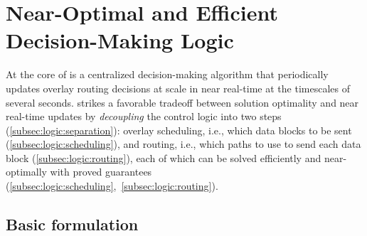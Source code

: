 \section{Near-Optimal and Efficient Decision-Making Logic}
\label{sec:logic}

At the core of \name is a centralized decision-making
algorithm that periodically updates overlay
routing decisions at scale  in near real-time at the timescales of several seconds.
\name strikes a favorable tradeoff between solution optimality
and near real-time updates by
{\em decoupling} the control logic into two steps (\Section\ref{subsec:logic:separation}):
overlay scheduling, i.e., which data blocks to be sent
(\Section\ref{subsec:logic:scheduling}),
and routing, i.e., which paths to use to send each data block
(\Section\ref{subsec:logic:routing}), each of which
can be solved efficiently and near-optimally with proved guarantees
(\Section\ref{subsec:logic:scheduling},~\ref{subsec:logic:routing}).



\subsection{Basic formulation}
\label{subsec:logic:formulation}

